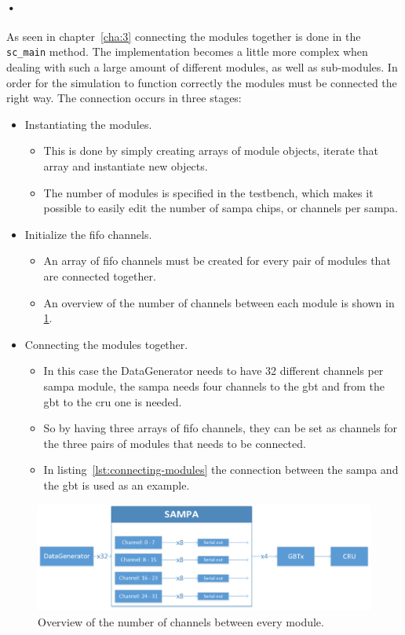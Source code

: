 \documentclass[a4paper, 12pt]{report}
\newcommand{\codeword}[1]{\texttt{#1}}
\begin{document}
\paragraph{•}
As seen in chapter~\ref{cha:3} connecting the modules together is done in the \codeword{sc\_main} method.
The implementation becomes a little more complex when dealing with such a large amount of different modules, as well as sub-modules.
In order for the simulation to function correctly the modules must be connected the right way.
The connection occurs in three stages:
\begin{itemize}
	\item Instantiating the modules.
		\begin{itemize}
			\item This is done by simply creating arrays of module objects, iterate that array and instantiate new objects.
			\item The number of modules is specified in the testbench, which makes it possible to easily edit the number of \gls{sampa} chips, or channels per \gls{sampa}.
		\end{itemize}
	\item Initialize the \gls{fifo} channels.
		\begin{itemize}
			\item An array of \gls{fifo} channels must be created for every pair of modules that are connected together.
			\item An overview of the number of channels between each module is shown in \ref{fig:sampa-overview}.
		\end{itemize}
	\item Connecting the modules together.
		\begin{itemize}
			\item In this case the DataGenerator needs to have 32 different channels per \gls{sampa} module, the \gls{sampa} needs four channels to the \gls{gbt} and from the \gls{gbt} to the \gls{cru} one is needed.
			\item So by having three arrays of \gls{fifo} channels, they can be set as channels for the three pairs of modules that needs to be connected.
			\item In listing~\ref{lst:connecting-modules} the connection between the \gls{sampa} and the \gls{gbt} is used as an example.
		\end{itemize}
\end{itemize}

\begin{figure}[h!]
	\centering
		\includegraphics[width=1.0\textwidth]{images/sampa-overview.png}
		\caption{Overview of the number of channels between every module.}
		\label{fig:sampa-overview}
\end{figure}
\end{document}
